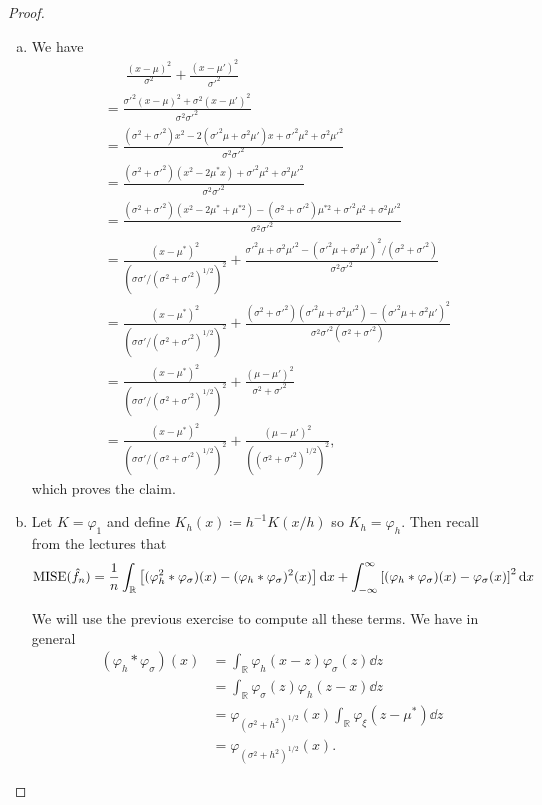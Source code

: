 \documentclass{article}
\theoremstyle{plain}
\theoremstyle{remark}
\renewcommand{\phi}{\varphi}
\newcommand{\Bb}{\mathbb}
\newcommand{\RR}{\Bb R}
\newcommand\ceq\coloneqq %
\DeclareMathOperator\MISE{MISE}
\begin{document}
\begin{proof}
	\begin{enumerate}[(a)]
		\item We have
		\begin{align*}
			&\phantom{=\ }\frac{(x-\mu)^2}{\sigma^2} + \frac{(x - \mu')^2}{\sigma'^2} \\
			&= \frac{\sigma'^2(x - \mu)^2 + \sigma^2(x - \mu')^2}{\sigma^2\sigma'^2} \\
			&= \frac{(\sigma^2 + \sigma'^2)x^2 - 2 (\sigma'^2 \mu + \sigma^2 \mu')x + \sigma'^2 \mu^2 + \sigma^2\mu'^2}{\sigma^2 \sigma'^2} \\
			&=  \frac{(\sigma^2 + \sigma'^2)(x^2 - 2\mu^*x) + \sigma'^2 \mu^2 + \sigma^2\mu'^2}{\sigma^2 \sigma'^2} \\
			&= \frac{(\sigma^2 + \sigma'^2)(x^2 - 2\mu^* + \mu^{*2}) - (\sigma^2 + \sigma'^2)\mu^{*2} + \sigma'^2 \mu^2 + \sigma^2\mu'^2}{\sigma^2 \sigma'^2} \\
			&= \frac{(x - \mu^*)^2}{(\sigma\sigma'/(\sigma^2 + \sigma'^2)^{1/2})^2} + \frac{\sigma'^2 \mu + \sigma^2 \mu'^2 - (\sigma'^2\mu + \sigma^2\mu')^2/(\sigma^2 + \sigma'^2)}{\sigma^2\sigma'^2} \\
			&= \frac{(x - \mu^*)^2}{(\sigma\sigma'/(\sigma^2 + \sigma'^2)^{1/2})^2} + \frac{(\sigma^2 + \sigma'^2)(\sigma'^2\mu + \sigma^2\mu'^2) - (\sigma'^2\mu + \sigma^2\mu')^2}{\sigma^2 \sigma'^2(\sigma^2 + \sigma'^2)} \\
			&= \frac{(x - \mu^*)^2}{(\sigma\sigma'/(\sigma^2 + \sigma'^2)^{1/2})^2} + \frac{(\mu - \mu')^2}{\sigma^2 + \sigma'^2} \\
			&= \frac{(x - \mu^*)^2}{(\sigma\sigma'/(\sigma^2 + \sigma'^2)^{1/2})^2} + \frac{(\mu - \mu')^2}{((\sigma^2 + \sigma'^2)^{1/2})^2}, 
		\end{align*}
	which proves the claim. 
	\item Let $K = \phi_1$ and define $K_h(x) \ceq h^{-1} K(x/h)$ so $K_h = \phi_h$. Then recall from the lectures that
	\[
	\MISE(\hat f_n) = \frac1n \int_\RR \qty[(\phi_h^2 * \phi_\sigma)(x) - (\phi_h * \phi_\sigma)^2(x)] \dd{x} + \int_{-\infty}^\infty \qty[ (\phi_h * \phi_\sigma)(x) - \phi_\sigma(x)]^2 \dd{x}
	\]
	
	We will use the previous exercise to compute all these terms. 
	We have in general 
	\begin{align}
		(\phi_h * \phi_\sigma)(x) &= \int_\RR \phi_h(x-z) \phi_\sigma(z) \dd{z}\nonumber \\
		&= \int_\RR \phi_\sigma(z) \phi_h(z-x) \dd{z} \nonumber\\
		&= \phi_{(\sigma^2 + h^2)^{1/2}}(x) \int_\RR \phi_\xi(z - \mu^*) \dd{z} \nonumber\\
		&= \phi_{(\sigma^2 + h^2)^{1/2}}(x) \label{eq:normal_convolve}. 
	\end{align}


\end{enumerate}
\end{proof}
\end{document}

